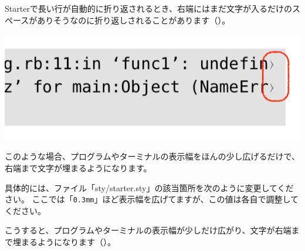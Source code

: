 Starterで長い行が自動的に折り返されるとき、右端にはまだ文字が入るだけのスペースがありそうなのに折り返しされることがあります（）。

\begin{reviewimage}%
\includegraphics[width=0.7\maxwidth]{./images/chap02-faq/codeblock_rpadding1.png}%
\label{image:chap02-faq:codeblock_rpadding1}
\end{reviewimage}

このような場合、プログラムやターミナルの表示幅をほんの少し広げるだけで、右端まで文字が埋まるようになります。

具体的には、ファイル「sty/starter.sty」の該当箇所を次のように変更してください。
ここでは「\texttt{0.3mm}」ほど表示幅を広げてますが、この値は各自で調整してください。

\label{}
\begin{starterprogram}\end{starterprogram}

こうすると、プログラムやターミナルの表示幅が少しだけ広がり、文字が右端まで埋まるようになります（）。

